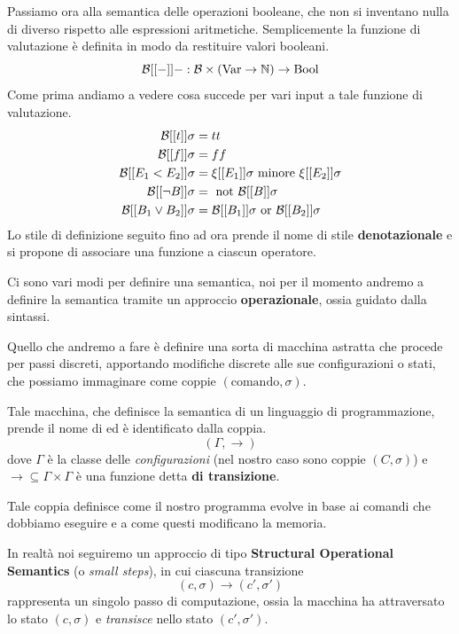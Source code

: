 Passiamo ora alla semantica delle operazioni booleane, che
non si inventano nulla di diverso rispetto alle espressioni
aritmetiche. Semplicemente la funzione di valutazione è
definita in modo da restituire valori booleani.
\[ \mathcal{B}[[-]] - : \mathcal{B} \times (\operatorname{Var} \to \mathbb{N}) \to \text{Bool} \]
Come prima andiamo a vedere cosa succede per vari input a
tale funzione di valutazione.
\begin{align*}
	\mathcal{B} [[t]] \sigma            & = tt                           \\
	\mathcal{B} [[f]] \sigma            & = ff                           \\
	\mathcal{B} [[E_1 < E_2]] \sigma    & =
	\xi [[E_1]] \sigma \text{ minore } \xi [[E_2]] \sigma       \\
	\mathcal{B} [[\lnot B]] \sigma      & = \text{ not } \mathcal{B} [[B]] \sigma \\
	\mathcal{B} [[B_1 \lor B_2]] \sigma & = \mathcal{B} [[B_1]] \sigma
	\text{ or } \mathcal{B} [[B_2]] \sigma
\end{align*}
Lo stile di definizione seguito fino ad ora prende il nome di
stile \textbf{denotazionale} e si propone di associare una
funzione a ciascun operatore.

Ci sono vari modi per definire una semantica, noi per il
momento andremo a definire la semantica tramite un approccio
\textbf{operazionale}, ossia guidato dalla sintassi.

Quello che andremo a fare è definire una sorta di macchina
astratta che procede per passi discreti, apportando modifiche
discrete alle sue configurazioni o stati, che possiamo
immaginare come coppie $(\text{comando}, \sigma)$.

Tale macchina, che definisce la semantica di un linguaggio
di programmazione, prende il nome di
 ed è identificato dalla coppia.
\[ (\Gamma, \to) \]
dove $\Gamma$ è la classe delle \emph{configurazioni} (nel
nostro caso sono coppie $(C, \sigma)$) e
$\to \subseteq \Gamma \times \Gamma$ è una funzione detta
\textbf{di transizione}.

Tale coppia definisce come il nostro programma evolve in base
ai comandi che dobbiamo eseguire e a come questi modificano
la memoria.

In realtà noi seguiremo un approccio di tipo
\textbf{Structural Operational Semantics} (o
\emph{small steps}), in cui ciascuna transizione
\[ (c, \sigma) \to (c', \sigma') \]
rappresenta un singolo passo di computazione, ossia la macchina
ha attraversato lo stato $(c, \sigma)$ e \emph{transisce} nello
stato $(c', \sigma')$.

